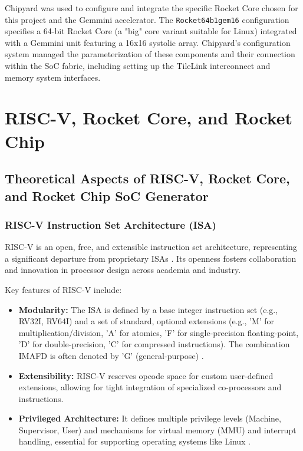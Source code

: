 Chipyard was used to configure and integrate the specific Rocket Core chosen for this project and the Gemmini accelerator. The \texttt{Rocket64b1gem16} configuration specifies a 64-bit Rocket Core (a "big" core variant suitable for Linux) integrated with a Gemmini unit featuring a 16x16 systolic array. Chipyard's configuration system managed the parameterization of these components and their connection within the SoC fabric, including setting up the TileLink interconnect and memory system interfaces.

\section{RISC-V, Rocket Core, and Rocket Chip}
\label{sec:riscv_rocket}

\subsection{Theoretical Aspects of RISC-V, Rocket Core, and Rocket Chip SoC Generator}
\label{sec:riscv_rocket_theoretical}
\subsubsection{RISC-V Instruction Set Architecture (ISA)}
RISC-V is an open, free, and extensible instruction set architecture, representing a significant departure from proprietary ISAs \cite{asanovic2014riscv}. Its openness fosters collaboration and innovation in processor design across academia and industry.

Key features of RISC-V include:
\begin{itemize}
    \item \textbf{Modularity:} The ISA is defined by a base integer instruction set (e.g., RV32I, RV64I) and a set of standard, optional extensions (e.g., 'M' for multiplication/division, 'A' for atomics, 'F' for single-precision floating-point, 'D' for double-precision, 'C' for compressed instructions). The combination IMAFD is often denoted by 'G' (general-purpose) \cite{asanovic2016rocketchip}.
    \item \textbf{Extensibility:} RISC-V reserves opcode space for custom user-defined extensions, allowing for tight integration of specialized co-processors and instructions.
    \item \textbf{Privileged Architecture:} It defines multiple privilege levels (Machine, Supervisor, User) and mechanisms for virtual memory (MMU) and interrupt handling, essential for supporting operating systems like Linux \cite{waterman2015riscvpriv}.
\end{itemize}

